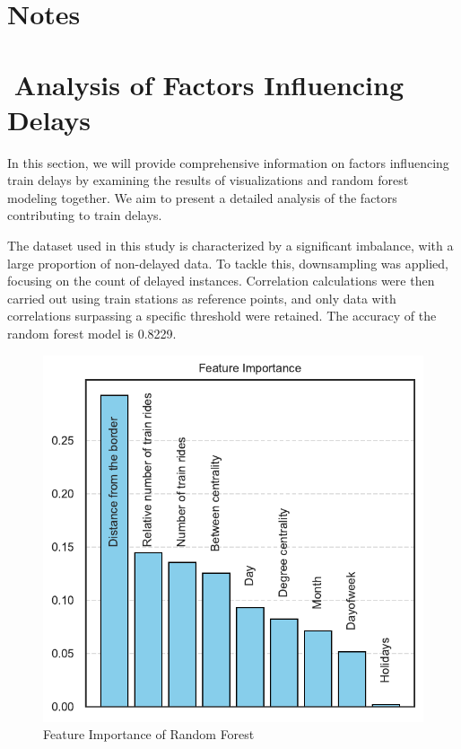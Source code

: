 \documentclass{article}
\theoremstyle{plain}
\theoremstyle{definition}
\theoremstyle{remark}
\begin{document}
\section*{Notes}

\section{Analysis of Factors Influencing Delays}

In this section, we will provide comprehensive information on factors influencing train delays by examining the results of visualizations and random forest modeling together. We aim to present a detailed analysis of the factors contributing to train delays.

The dataset used in this study is characterized by a significant imbalance, with a large proportion of non-delayed data. To tackle this, downsampling was applied, focusing on the count of delayed instances. Correlation calculations were then carried out using train stations as reference points, and only data with correlations surpassing a specific threshold were retained. The accuracy of the random forest model is 0.8229.

\begin{figure}
    \centering
    \includegraphics[width=1\linewidth]{fig/plot_JH_feature_importance.pdf}
    \caption{Feature Importance of Random Forest}
    \label{fig:enter-label}
\end{figure}
\end{document}
